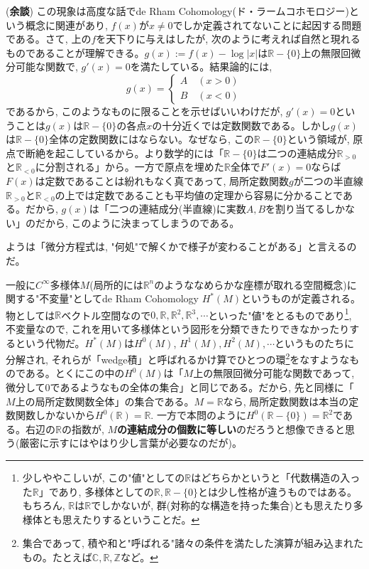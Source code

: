\documentclass[twocolumn]{jbook}
\theoremstyle{definition}
\newcommand{\bcas}{\begin{cases}}
\newcommand{\ecas}{\end{cases}}
\newcommand{\mb}{\mathbb}
\begin{document}
(\textbf{余談}) この現象は高度な話でde Rham Cohomology(ド・ラームコホモロジー)という概念に関連があり, $f(x)$が$x\neq 0$でしか定義されてないことに起因する問題である。さて, 上の$f$を天下りに与えはしたが, 次のように考えれば自然と現れるものであることが理解できる。$g(x) := f(x) - \log{|x|}$は$\mb{R}-\{ 0 \}$上の無限回微分可能な関数で, $g'(x) = 0$を満たしている。結果論的には, 
\[
g(x) = \bcas
A\quad (x > 0)\\
B\quad (x < 0)
\ecas
\]
であるから, このようなものに限ることを示せばいいわけだが, $g'(x) = 0$ということは$g(x)$は$\mb{R}-\{ 0 \}$の各点$x$の十分近くでは定数関数である。しかし$g(x)$は$\mb{R} - \{ 0 \}$全体の定数関数にはならない。なぜなら, この$\mb{R} - \{ 0 \}$という領域が, 原点で断絶を起こしているから。より数学的には「$\mb{R} - \{ 0 \}$は二つの連結成分$\mb{R}_{>0}$と$\mb{R}_{<0}$に分割される」から。一方で原点を埋めた$\mb{R}$全体で$F'(x) = 0$ならば$F(x)$は定数であることは紛れもなく真であって, 局所定数関数$g$が二つの半直線$\mb{R}_{>0}$と$\mb{R}_{<0}$の上では定数であることも平均値の定理から容易に分かることである。だから, $g(x)$は「二つの連結成分(半直線)に実数$A,B$を割り当てるしかない」のだから, このように決まってしまうのである。

ようは「微分方程式は, "何処"で解くかで様子が変わることがある」と言えるのだ。

一般に$C^{\infty}$多様体$M$(局所的には$\mb{R}^{n}$のようななめらかな座標が取れる空間概念)に関する"不変量"としてde Rham Cohomology $H^{\ast}(M)$というものが定義される。物としては$\mb{R}$ベクトル空間なので$0,\mb{R},\mb{R}^2,\mb{R}^3,\cdots$といった"値"をとるものであり\footnote{少しややこしいが, この"値"としての$\mb{R}$はどちらかというと「代数構造の入った$\mb{R}$」であり, 多様体としての$\mb{R}, \mb{R}-\{ 0 \}$とは少し性格が違うものではある。もちろん, $\mb{R}$は$\mb{R}$でしかないが, 群(対称的な構造を持った集合)とも思えたり多様体とも思えたりするということだ。}, 不変量なので, これを用いて多様体という図形を分類できたりできなかったりするという代物だ。$H^{\ast}(M)$は$H^{0}(M)$, $H^{1}(M),H^{2}(M),\cdots$というものたちに分解され, それらが「wedge積」と呼ばれるかけ算でひとつの環\footnote{集合であって, 積や和と"呼ばれる"諸々の条件を満たした演算が組み込まれたもの。たとえば$\mb{C},\mb{R},\mb{Z}$など。}をなすようなものである。とくにこの中の$H^{0}(M)$は「$M$上の無限回微分可能な関数であって, 微分して$0$であるようなもの全体の集合」と同じである。だから, 先と同様に「$M$上の局所定数関数全体」の集合である。$M=\mb{R}$なら, 局所定数関数は本当の定数関数しかないから$H^{0}(\mb{R}) = \mb{R}$.  一方で本問のように$H^{0}(\mb{R}-\{ 0 \}) = \mb{R}^2$である。右辺の$\mb{R}$の指数が, \textbf{$M$の連結成分の個数に等しい}のだろうと想像できると思う(厳密に示すにはやはり少し言葉が必要なのだが)。
\end{document}
